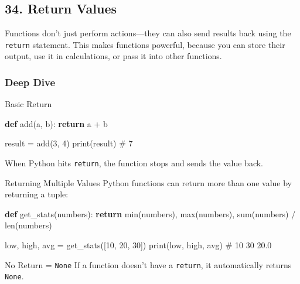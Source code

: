 \documentclass[
  letterpaper,
  DIV=11,
  numbers=noendperiod]{scrreprt}
\newenvironment{Shaded}{\begin{snugshade}}{\end{snugshade}}
\newcommand{\BuiltInTok}[1]{\textcolor[rgb]{0.00,0.23,0.31}{#1}}
\newcommand{\CommentTok}[1]{\textcolor[rgb]{0.37,0.37,0.37}{#1}}
\newcommand{\ControlFlowTok}[1]{\textcolor[rgb]{0.00,0.23,0.31}{\textbf{#1}}}
\newcommand{\DecValTok}[1]{\textcolor[rgb]{0.68,0.00,0.00}{#1}}
\newcommand{\KeywordTok}[1]{\textcolor[rgb]{0.00,0.23,0.31}{\textbf{#1}}}
\newcommand{\NormalTok}[1]{\textcolor[rgb]{0.00,0.23,0.31}{#1}}
\newcommand{\OperatorTok}[1]{\textcolor[rgb]{0.37,0.37,0.37}{#1}}
\begin{document}
\subsection{34. Return Values}\label{return-values}

Functions don't just perform actions---they can also send results back
using the \texttt{return} statement. This makes functions powerful,
because you can store their output, use it in calculations, or pass it
into other functions.

\subsubsection{Deep Dive}\label{deep-dive-33}

Basic Return

\begin{Shaded}
\begin{Highlighting}[]
\KeywordTok{def}\NormalTok{ add(a, b):}
    \ControlFlowTok{return}\NormalTok{ a }\OperatorTok{+}\NormalTok{ b}

\NormalTok{result }\OperatorTok{=}\NormalTok{ add(}\DecValTok{3}\NormalTok{, }\DecValTok{4}\NormalTok{)}
\BuiltInTok{print}\NormalTok{(result)   }\CommentTok{\# 7}
\end{Highlighting}
\end{Shaded}

When Python hits \texttt{return}, the function stops and sends the value
back.

Returning Multiple Values Python functions can return more than one
value by returning a tuple:

\begin{Shaded}
\begin{Highlighting}[]
\KeywordTok{def}\NormalTok{ get\_stats(numbers):}
    \ControlFlowTok{return} \BuiltInTok{min}\NormalTok{(numbers), }\BuiltInTok{max}\NormalTok{(numbers), }\BuiltInTok{sum}\NormalTok{(numbers) }\OperatorTok{/} \BuiltInTok{len}\NormalTok{(numbers)}

\NormalTok{low, high, avg }\OperatorTok{=}\NormalTok{ get\_stats([}\DecValTok{10}\NormalTok{, }\DecValTok{20}\NormalTok{, }\DecValTok{30}\NormalTok{])}
\BuiltInTok{print}\NormalTok{(low, high, avg)   }\CommentTok{\# 10 30 20.0}
\end{Highlighting}
\end{Shaded}

No Return = \texttt{None} If a function doesn't have a \texttt{return},
it automatically returns \texttt{None}.
\end{document}
